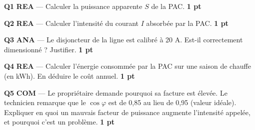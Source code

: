 \documentclass[a4paper,11pt]{article}
\newcommand{\pts}[1]{\hfill\textcolor{gris}{\small\textbf{#1}}}
\newcommand{\comp}[1]{\colorbox{blue!10}{\scriptsize\textbf{#1}}}
\begin{document}
\begin{center}
\end{center}

\textbf{Q1} \comp{REA} — Calculer la puissance apparente $S$ de la PAC. \pts{1 pt}

\begin{reponsebox}[3cm]
\dotfill

\dotfill

\dotfill
\end{reponsebox}

\textbf{Q2} \comp{REA} — Calculer l'intensité du courant $I$ absorbée par la PAC. \pts{1 pt}

\begin{reponsebox}[3cm]
\dotfill

\dotfill

\dotfill
\end{reponsebox}

\textbf{Q3} \comp{ANA} — Le disjoncteur de la ligne est calibré à 20 A. Est-il correctement dimensionné ? Justifier. \pts{1 pt}

\begin{reponsebox}[2.5cm]
\dotfill

\dotfill
\end{reponsebox}

\textbf{Q4} \comp{REA} — Calculer l'énergie consommée par la PAC sur une saison de chauffe (en kWh). En déduire le coût annuel. \pts{1 pt}

\begin{reponsebox}[3.5cm]
\dotfill

\dotfill

\dotfill

\dotfill
\end{reponsebox}

\textbf{Q5} \comp{COM} — Le propriétaire demande pourquoi sa facture est élevée. Le technicien remarque que le $\cos\varphi$ est de 0,85 au lieu de 0,95 (valeur idéale). Expliquer en quoi un mauvais facteur de puissance augmente l'intensité appelée, et pourquoi c'est un problème. \pts{1 pt}
\end{document}
